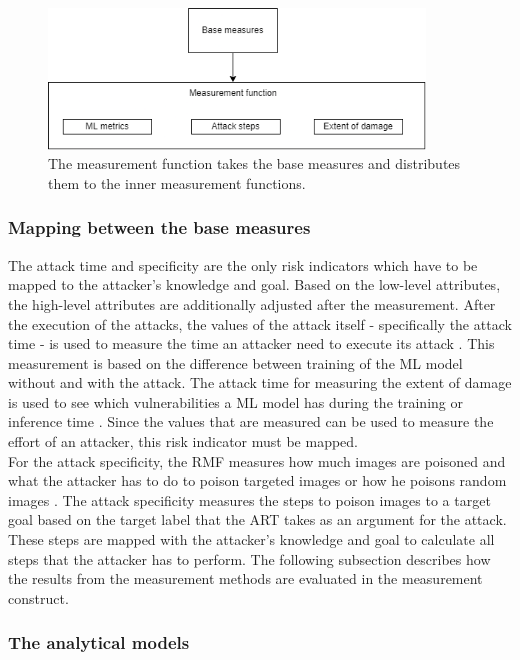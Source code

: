 \begin{figure}[ht!]
  \centering
  \includegraphics[width=10cm]{pictures/impl_meas_func.png}
  \caption{The measurement function takes the base measures and distributes them to the inner measurement functions.}
  \label{fig:impl_meas_func}
\end{figure}

\subsubsection*{Mapping between the base measures}

The attack time and specificity are the only risk indicators which have to be mapped to the attacker's knowledge and goal. Based on the low-level attributes, the high-level attributes are additionally adjusted after the measurement. After the execution of the attacks, the values of the attack itself - specifically the attack time - is used to measure the time an attacker need to execute its attack \cite{DBLP:journals/corr/abs-2012-04884}. This measurement is based on the difference between training of the ML model without and with the attack. The attack time for measuring the extent of damage is used to see which vulnerabilities a ML model has during the training or inference time \cite{DBLP:journals/csur/RosenbergSER21}. Since the values that are measured can be used to measure the effort of an attacker, this risk indicator must be mapped. \\
For the attack specificity, the RMF measures how much images are poisoned and what the attacker has to do to poison targeted images \cite{DBLP:conf/iccv/ZhuNXWW21} or how he poisons random images \cite{DBLP:journals/corr/abs-1708-06733}. The attack specificity measures the steps to poison images to a target goal based on the target label that the ART takes as an argument for the attack. These steps are mapped with the attacker's knowledge and goal to calculate all steps that the attacker has to perform.
The following subsection describes how the results from the measurement methods are evaluated in the measurement construct.

\subsubsection*{The analytical models}

